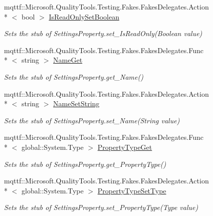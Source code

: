 \begin{DoxyCompactItemize}
mqttf\-::\-Microsoft.\-Quality\-Tools.\-Testing.\-Fakes.\-Fakes\-Delegates.\-Action\\*
$<$ bool $>$ \hyperlink{class_system_1_1_configuration_1_1_fakes_1_1_stub_settings_property_ab9f919a60d03abd6b1ea8b5724887d21}{Is\-Read\-Only\-Set\-Boolean}
\begin{DoxyCompactList}\small\item\em Sets the stub of Settings\-Property.\-set\-\_\-\-Is\-Read\-Only(\-Boolean value)\end{DoxyCompactList}\item 
mqttf\-::\-Microsoft.\-Quality\-Tools.\-Testing.\-Fakes.\-Fakes\-Delegates.\-Func\\*
$<$ string $>$ \hyperlink{class_system_1_1_configuration_1_1_fakes_1_1_stub_settings_property_a1bc4e2854a021c4257cc4ba3bc6a564a}{Name\-Get}
\begin{DoxyCompactList}\small\item\em Sets the stub of Settings\-Property.\-get\-\_\-\-Name()\end{DoxyCompactList}\item 
mqttf\-::\-Microsoft.\-Quality\-Tools.\-Testing.\-Fakes.\-Fakes\-Delegates.\-Action\\*
$<$ string $>$ \hyperlink{class_system_1_1_configuration_1_1_fakes_1_1_stub_settings_property_aa6dd28afc64825c166f1ec2bbfed7107}{Name\-Set\-String}
\begin{DoxyCompactList}\small\item\em Sets the stub of Settings\-Property.\-set\-\_\-\-Name(\-String value)\end{DoxyCompactList}\item 
mqttf\-::\-Microsoft.\-Quality\-Tools.\-Testing.\-Fakes.\-Fakes\-Delegates.\-Func\\*
$<$ global\-::\-System.\-Type $>$ \hyperlink{class_system_1_1_configuration_1_1_fakes_1_1_stub_settings_property_add1c0a440163ffcaf2b93d0cc9c6eefc}{Property\-Type\-Get}
\begin{DoxyCompactList}\small\item\em Sets the stub of Settings\-Property.\-get\-\_\-\-Property\-Type()\end{DoxyCompactList}\item 
mqttf\-::\-Microsoft.\-Quality\-Tools.\-Testing.\-Fakes.\-Fakes\-Delegates.\-Action\\*
$<$ global\-::\-System.\-Type $>$ \hyperlink{class_system_1_1_configuration_1_1_fakes_1_1_stub_settings_property_a3d6723886f97486f4d1c3d091d95906f}{Property\-Type\-Set\-Type}
\begin{DoxyCompactList}\small\item\em Sets the stub of Settings\-Property.\-set\-\_\-\-Property\-Type(\-Type value)\end{DoxyCompactList}\item 

\end{DoxyCompactItemize}
